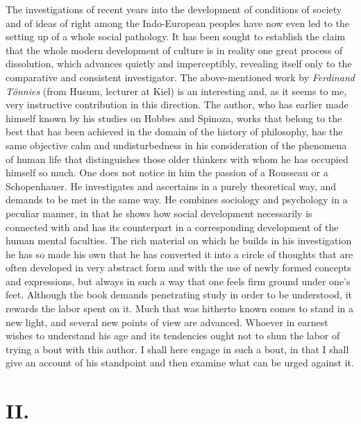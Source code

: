 \documentclass[12pt,a4paper,openany]{book}
\newcommand{\opage}[1]{\marginnote{\footnotesize\textit{[#1]}}}
\begin{document}
The investigations of recent years into the development of conditions of society
and of ideas of right among the Indo-European
\opage{144}peoples have now even led to the setting up of a whole social
pathology. It has been sought to establish the claim that the whole
modern development of culture is in reality one great
process of dissolution, which advances quietly and imperceptibly, revealing
itself only to the comparative and consistent
investigator. The above-mentioned work by \emph{Ferdinand Tönnies} (from
Husum, lecturer at Kiel) is an interesting and, as it
seems to me, very instructive contribution in this direction.
The author, who has earlier made himself known by his studies
on Hobbes and Spinoza, works that belong to the
best that has been achieved in the domain of the history of philosophy, has
the same objective calm and undisturbedness in his consideration of
the phenomena of human life that distinguishes those older
thinkers with whom he has occupied himself so much. One does not notice
in him the passion of a Rousseau or a Schopenhauer.
He investigates and ascertains in a purely theoretical way, and demands to be
met in the same way. He
combines sociology and psychology in a peculiar manner,
in that he shows how social development necessarily
is connected with and has its counterpart in a corresponding
development of the human mental faculties. The rich material
on which he builds in his investigation he has so made
his own that he has converted it into a circle of thoughts
that are often developed in very abstract form and with the use
of newly formed concepts and expressions, but always in such a way that
one feels firm ground under one's feet. Although the book demands
penetrating study in order to be understood, it rewards the labor
spent on it. Much that was hitherto known comes
to stand in a new light, and several new points of view
are advanced. Whoever in earnest wishes to understand his age and its
tendencies ought not to shun the labor of trying a bout with
this author. I shall here engage in such a bout,
in that I shall give an account of his standpoint and then
examine what can be urged against it.

\section*{II.}
\end{document}

